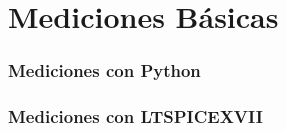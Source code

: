 


\section{Mediciones Básicas}

\subsubsection{Mediciones con Python}

\subsubsection{Mediciones con LTSPICEXVII}

